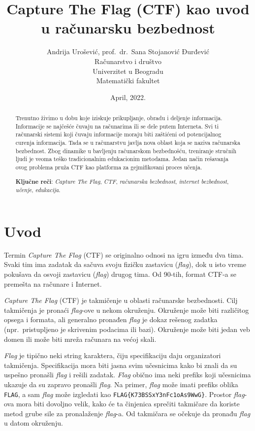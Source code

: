 \documentclass[12pt, a4paper, twocolumn]{article}
\title{Capture The Flag (CTF) kao uvod u računarsku bezbednost}
\author{Andrija Urošević, prof.\ dr.\ Sana Stojanović Đurđević\\Računarstvo i društvo\\Univerzitet u Beogradu\\Matematički fakultet}
\date{April, 2022.}
\begin{document}
\maketitle

\begin{abstract}
    Trenutno živimo u dobu koje iziskuje prikupljanje, obradu i deljenje 
    informacija. Informacije se najčešće čuvaju na računarima ili se dele
    putem Interneta. Svi ti računarski sistemi koji čuvaju informacije moraju
    biti zaštićeni od potencijalnog curenja informacija. Tada se u računarstvu
    javlja nova oblast koja se naziva računarska bezbednost. Zbog dinamike u 
    bavljenju računarskom bezbednošću, treniranje stručnih ljudi je veoma
    teško tradicionalnim edukacionim metodama. Jedan način rešavanja ovog 
    problema pruža CTF kao platforma za gejmifikovani proces učenja.

    \textbf{Ključne reči}: \emph{Capture The Flag}, \emph{CTF}, 
    \emph{računarska bezbednost}, \emph{internet bezbednost}, \emph{učenje}, 
    \emph{edukacija}.
\end{abstract}

\section{Uvod}

Termin \emph{Capture The Flag} (CTF) se originalno odnosi na igru između dva
tima. Svaki tim ima zadatak da sačuva svoju fizičku zastavicu (\emph{flag}), 
dok u isto vreme pokušava da osvoji zastavicu (\emph{flag}) drugog tima.
Od 90-tih, format CTF-a se premešta na računare i Internet. 

\emph{Capture The Flag} (CTF) je takmičenje u oblasti računarske bezbednosti.
Cilj takmičenja je pronaći \emph{flag}-ove u nekom okruženju. Okruženje može
biti različitog opsega i formata, ali generalno pronađen \emph{flag} je dokaz
rešenog zadatka (npr.\ pristupljeno je skrivenim podacima ili bazi). Okruženje 
može biti jedan veb domen ili može biti mreža računara na većoj skali.

\emph{Flag} je tipično neki string karaktera, čiju specifikaciju daju
organizatori takmičenja. Specifikacija mora biti jasna svim učesnicima kako 
bi znali da su uspešno pronašli \emph{flag} i rešili zadatak. \emph{Flag}
obično ima neki prefiks koji učesnicima ukazuje da su zapravo pronašli 
\emph{flag}. Na primer, \emph{flag} može imati prefiks oblika \texttt{FLAG},
a sam \emph{flag} može izgledati kao \texttt{FLAG\{K73BSSxY3nFc1oAs9WwG\}}.
Prostor \emph{flag}-ova mora biti dovoljno velik, kako će ta činjenica 
sprečiti takmičare da koriste metod grube sile za pronalaženje \emph{flag}-a. 
Od takmičara se očekuje da pronađu \emph{flag} u datom okruženju.
\end{document}
